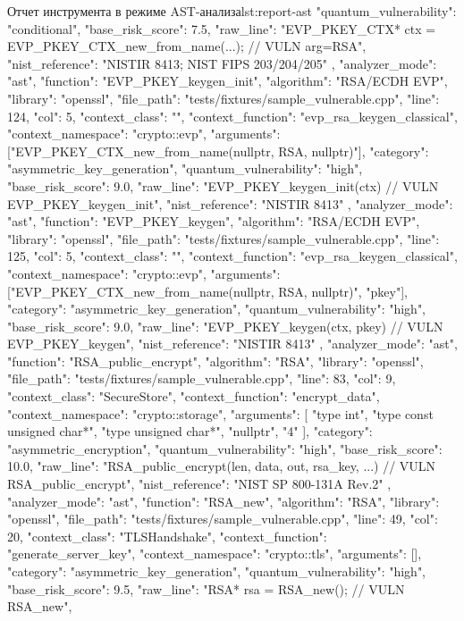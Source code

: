\documentclass{itmo-vkr}
\begin{document}
\begin{itmolisting}[JSON]{Отчет инструмента в режиме AST-анализа}{lst:report-ast}
{{			"quantum_vulnerability": "conditional",
			"base_risk_score": 7.5,
			"raw_line": "EVP_PKEY_CTX* ctx = EVP_PKEY_CTX_new_from_name(...); // VULN arg=RSA",
			"nist_reference": "NISTIR 8413; NIST FIPS 203/204/205"
		},
		{
			"analyzer_mode": "ast",
			"function": "EVP_PKEY_keygen_init",
			"algorithm": "RSA/ECDH EVP",
			"library": "openssl",
			"file_path": "tests/fixtures/sample_vulnerable.cpp",
			"line": 124,
			"col": 5,
			"context_class": "",
			"context_function": "evp_rsa_keygen_classical",
			"context_namespace": "crypto::evp",
			"arguments": ["EVP_PKEY_CTX_new_from_name(nullptr, RSA, nullptr)"],
			"category": "asymmetric_key_generation",
			"quantum_vulnerability": "high",
			"base_risk_score": 9.0,
			"raw_line": "EVP_PKEY_keygen_init(ctx) // VULN EVP_PKEY_keygen_init",
			"nist_reference": "NISTIR 8413"
		},
		{
			"analyzer_mode": "ast",
			"function": "EVP_PKEY_keygen",
			"algorithm": "RSA/ECDH EVP",
			"library": "openssl",
			"file_path": "tests/fixtures/sample_vulnerable.cpp",
			"line": 125,
			"col": 5,
			"context_class": "",
			"context_function": "evp_rsa_keygen_classical",
			"context_namespace": "crypto::evp",
			"arguments": ["EVP_PKEY_CTX_new_from_name(nullptr, RSA, nullptr)", "pkey"],
			"category": "asymmetric_key_generation",
			"quantum_vulnerability": "high",
			"base_risk_score": 9.0,
			"raw_line": "EVP_PKEY_keygen(ctx, pkey) // VULN EVP_PKEY_keygen",
			"nist_reference": "NISTIR 8413"
		},
		{
			"analyzer_mode": "ast",
			"function": "RSA_public_encrypt",
			"algorithm": "RSA",
			"library": "openssl",
			"file_path": "tests/fixtures/sample_vulnerable.cpp",
			"line": 83,
			"col": 9,
			"context_class": "SecureStore",
			"context_function": "encrypt_data",
			"context_namespace": "crypto::storage",
			"arguments": [
			"type int",
			"type const unsigned char*",
			"type unsigned char*",
			"nullptr",
			"4"
			],
			"category": "asymmetric_encryption",
			"quantum_vulnerability": "high",
			"base_risk_score": 10.0,
			"raw_line": "RSA_public_encrypt(len, data, out, rsa_key, ...) // VULN RSA_public_encrypt",
			"nist_reference": "NIST SP 800-131A Rev.2"
		},
		{
			"analyzer_mode": "ast",
			"function": "RSA_new",
			"algorithm": "RSA",
			"library": "openssl",
			"file_path": "tests/fixtures/sample_vulnerable.cpp",
			"line": 49,
			"col": 20,
			"context_class": "TLSHandshake",
			"context_function": "generate_server_key",
			"context_namespace": "crypto::tls",
			"arguments": [],
			"category": "asymmetric_key_generation",
			"quantum_vulnerability": "high",
			"base_risk_score": 9.5,
			"raw_line": "RSA* rsa = RSA_new(); // VULN RSA_new",
}}
\end{itmolisting}
\end{document}
